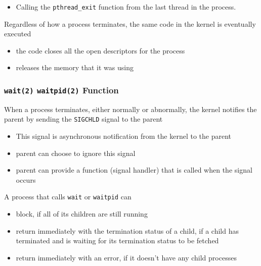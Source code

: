 \documentclass[newPxFont,sthlmFooter,nooffset]{beamer}
\begin{document}
\begin{frame}[t]
\begin{itemize}
  \item Calling the \texttt{pthread\_exit} function from the last
    thread in the process.
  \end{itemize}

Regardless of how a process terminates, the same code in the kernel is eventually executed
\begin{itemize}
\item the code closes all the open descriptors for the process
\item releases the memory that it was using
\end{itemize}
\end{frame}



\begin{frame}[t]
  \frametitle{\texttt{wait(2)} \texttt{waitpid(2)} Function}
When a process terminates, either normally or abnormally, the kernel notifies the parent by sending the \texttt{SIGCHLD} signal to the parent
\begin{itemize}
\item This signal is asynchronous notification from the kernel to the parent
\item parent can choose to ignore this signal
\item parent can provide a function (signal handler) that is called when the signal occurs
\end{itemize}

A process that calls \texttt{wait} or \texttt{waitpid} can
\begin{itemize}
\item block, if all of its children are still running
\item return immediately with the termination status of a child, if a child has terminated and is waiting for its termination status to be fetched
\item return immediately with an error, if it doesn't have any child processes
\end{itemize}
\end{frame}
\end{document}
